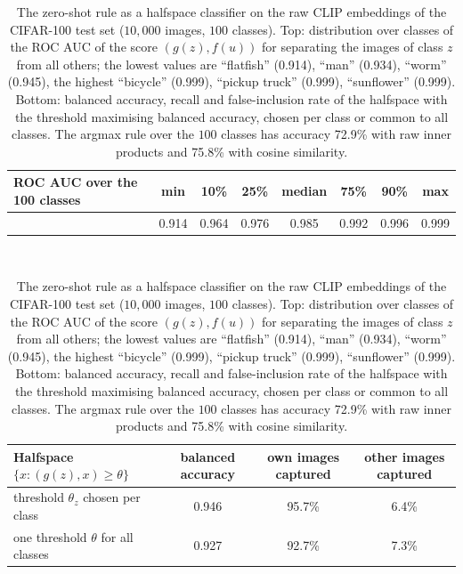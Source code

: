 \begin{table}[tb]
\centering
\begin{tabular}{lccccccc}
\hline
ROC AUC over the 100 classes & min & 10\% & 25\% & median & 75\% & 90\% & max \\
\hline
 & 0.914 & 0.964 & 0.976 & 0.985 & 0.992 & 0.996 & 0.999 \\
\hline
\end{tabular}
\\[2mm]
\begin{tabular}{lccc}
\hline
Halfspace $\{x:(g(z),x)\ge\theta\}$ & balanced accuracy & own images captured & other images captured \\
\hline
threshold $\theta_z$ chosen per class & 0.946 & 95.7\% & 6.4\% \\
one threshold $\theta$ for all classes & 0.927 & 92.7\% & 7.3\% \\
\hline
\end{tabular}
\caption{The zero-shot rule as a halfspace classifier on the raw CLIP embeddings of the CIFAR-100 test set ($10{,}000$ images, $100$ classes). Top: distribution over classes of the ROC AUC of the score $(g(z),f(u))$ for separating the images of class $z$ from all others; the lowest values are ``flatfish'' (0.914), ``man'' (0.934), ``worm'' (0.945), the highest ``bicycle'' (0.999), ``pickup truck'' (0.999), ``sunflower'' (0.999). Bottom: balanced accuracy, recall and false-inclusion rate of the halfspace with the threshold maximising balanced accuracy, chosen per class or common to all classes. The argmax rule over the $100$ classes has accuracy 72.9\% with raw inner products and 75.8\% with cosine similarity.}
\label{tab:clip-auc}
\end{table}
